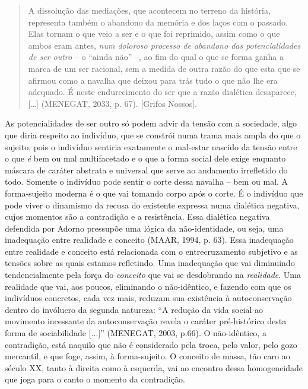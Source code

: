 \begin{quote}
A dissolução das mediações, que acontecem no terreno da história,
representa também o abandono da memória e dos laços com o passado. Elas
tornam o que veio a ser e o que foi reprimido, assim como o que ambos
eram antes, \emph{num doloroso processo de abandono das potencialidades
de ser outro} -- o ``ainda não'' --, ao fim do qual o que se forma ganha
a marca de um ser racional, sem a medida de outra razão do que esta que
se afirmou como a navalha que deixou para trás tudo o que não lhe era
adequado. É neste endurecimento do ser que a razão dialética desaparece,
{[}\ldots{}{]} (MENEGAT, 2033, p. 67). {[}Grifos Nossos{]}.
\end{quote}

As potencialidades de ser outro só podem advir da tensão com a
sociedade, algo que diria respeito ao indivíduo, que se constrói numa
trama mais ampla do que o sujeito, pois o indivíduo sentiria exatamente
o mal-estar nascido da tensão entre o que \emph{é} bem ou mal
multifacetado e o que a forma social dele exige enquanto máscara de
caráter abstrata e universal que serve ao andamento irrefletido do todo.
Somente o indivíduo pode sentir o corte dessa navalha -- bem ou mal. A
forma-sujeito moderna é o que vai tomando corpo após o corte. É o
indivíduo que pode viver o dinamismo da recusa do existente expressa
numa dialética negativa, cujos momentos são a contradição e a
resistência. Essa dialética negativa defendida por Adorno pressupõe uma
lógica da não-identidade, ou seja, uma inadequação entre realidade e
conceito (MAAR, 1994, p. 63). Essa inadequação entre realidade e
conceito está relacionada com o entrecruzamento subjetivo e as tensões
sobre as quais estamos refletindo. Uma inadequação que vai diminuindo
tendencialmente pela força do \emph{conceito} que vai se desdobrando na
\emph{realidade}. Uma realidade que vai, aos poucos, eliminando o
não-idêntico, e fazendo com que os indivíduos concretos, cada vez mais,
reduzam sua existência à autoconservação dentro do invólucro da segunda
natureza: ``A redução da vida social ao movimento incessante da
autoconservação revela o caráter pré-histórico desta forma de
sociabilidade {[}...{]}'' (MENEGAT, 2003, p.66). O não-idêntico, a
contradição, está naquilo que não é considerado pela troca, pelo valor,
pelo gozo mercantil, e que foge, assim, à forma-sujeito. O conceito de
massa, tão caro ao século XX, tanto à direita como à esquerda, vai ao
encontro dessa homogeneidade que joga para o canto o momento da
contradição.

